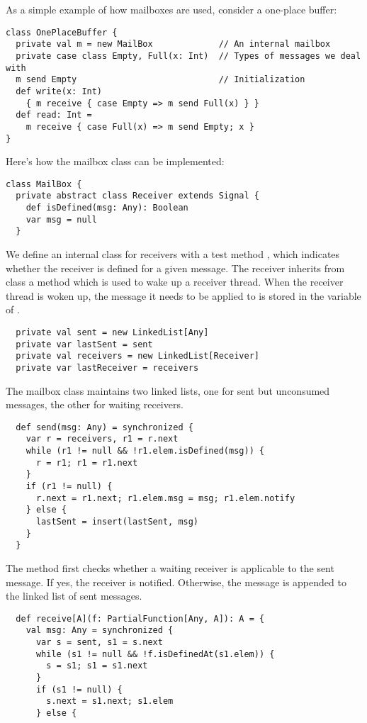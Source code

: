 {As a simple example of how mailboxes are used, consider a
one-place buffer:
\begin{lstlisting}
class OnePlaceBuffer {
  private val m = new MailBox             // An internal mailbox
  private case class Empty, Full(x: Int)  // Types of messages we deal with
  m send Empty                            // Initialization
  def write(x: Int)
    { m receive { case Empty => m send Full(x) } }
  def read: Int =
    m receive { case Full(x) => m send Empty; x }
}
\end{lstlisting}
Here's how the mailbox class can be implemented:
\begin{lstlisting}
class MailBox {
  private abstract class Receiver extends Signal {
    def isDefined(msg: Any): Boolean
    var msg = null
  }
\end{lstlisting}
We define an internal class for receivers with a test method
, which indicates whether the receiver is
defined for a given message.  The receiver inherits from class
 a  method which is used to wake up a
receiver thread. When the receiver thread is woken up, the message it
needs to be applied to is stored in the  variable of
.
\begin{lstlisting}
  private val sent = new LinkedList[Any]
  private var lastSent = sent
  private val receivers = new LinkedList[Receiver]
  private var lastReceiver = receivers
\end{lstlisting}
The mailbox class maintains two linked lists,
one for sent but unconsumed messages, the other for waiting receivers.
\begin{lstlisting}
  def send(msg: Any) = synchronized {
    var r = receivers, r1 = r.next
    while (r1 != null && !r1.elem.isDefined(msg)) {
      r = r1; r1 = r1.next
    }
    if (r1 != null) {
      r.next = r1.next; r1.elem.msg = msg; r1.elem.notify
    } else {
      lastSent = insert(lastSent, msg)
    }
  }
\end{lstlisting}
The  method first checks whether a waiting receiver is
applicable to the sent message. If yes, the receiver is notified.
Otherwise, the message is appended to the linked list of sent messages.
\begin{lstlisting}
  def receive[A](f: PartialFunction[Any, A]): A = {
    val msg: Any = synchronized {
      var s = sent, s1 = s.next
      while (s1 != null && !f.isDefinedAt(s1.elem)) {
        s = s1; s1 = s1.next
      }
      if (s1 != null) {
        s.next = s1.next; s1.elem
      } else {

\end{lstlisting}}
